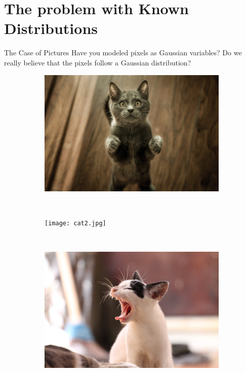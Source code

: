 
\section{The problem with Known Distributions}

\begin{frame}
\tableofcontents[current]
\end{frame}

\begin{frame}{The Case of Pictures}
Have you modeled pixels as Gaussian variables?
Do we really believe that the pixels follow a Gaussian distribution?
\begin{figure}
\begin{subfigure}{.3\textwidth}
\includegraphics[scale=.02]{cat1.jpg} 
\end{subfigure}
~
\begin{subfigure}{.3\textwidth}
\texttt{[image: cat2.jpg]} 
\end{subfigure}
~
\begin{subfigure}{.3\textwidth}
\includegraphics[scale=.02]{cat3.jpg} 
\end{subfigure}
\end{figure}
\end{frame}

